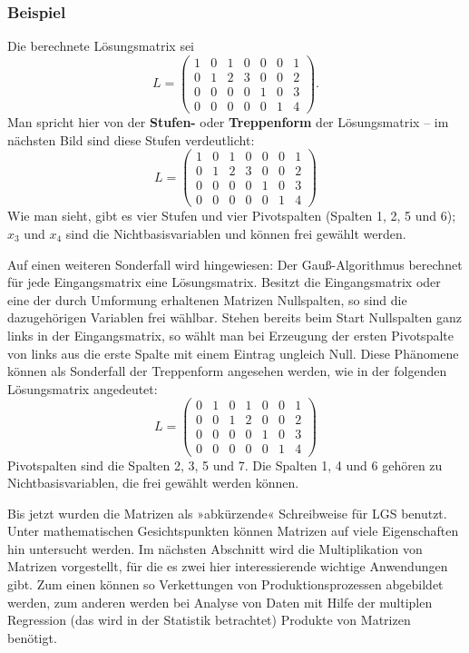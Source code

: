 \subsubsection{Beispiel}

Die berechnete Lösungsmatrix sei
\[ L = \left(\begin{array}{cccccc|c} 1 & 0 & 1 & 0 & 0 & 0 & 1\\ 0 & 1 & 2 & 3 & 0 & 0 & 2\\ 0 & 0 & 0 & 0 & 1 & 0 & 3\\ 0 & 0 & 0 & 0 & 0 & 1 & 4 \end{array}\right) . \]
Man spricht hier von der \textbf{Stufen-} oder \textbf{Treppenform} der Lösungsmatrix -- im nächsten Bild sind diese Stufen verdeutlicht:
\[ L = \left(\begin{array}{cccccc|c} \boxed{1} & 0 & 1 & 0 & 0 & 0 & 1\\ 0 & \boxed{1} & 2 & 3 & 0 & 0 & 2\\ 0 & 0 & 0 & 0 & \boxed{1} & 0 & 3\\ 0 & 0 & 0 & 0 & 0 & \boxed{1} & 4 \end{array}\right) \]
Wie man sieht, gibt es vier Stufen und vier Pivotspalten (Spalten 1, 2, 5 und 6); $x_3$ und $x_4$ sind die Nichtbasisvariablen und können frei gewählt werden.

Auf einen weiteren Sonderfall wird hingewiesen: Der Gauß-Algorithmus berechnet für jede Eingangsmatrix eine Lösungsmatrix. Besitzt die Eingangsmatrix oder eine der durch Umformung erhaltenen Matrizen Nullspalten, so sind die dazugehörigen Variablen frei wählbar. Stehen bereits beim Start Nullspalten ganz links in der Eingangsmatrix, so wählt man bei Erzeugung der ersten Pivotspalte von links aus die erste Spalte mit einem Eintrag ungleich Null. Diese Phänomene können als Sonderfall der Treppenform angesehen werden, wie in der folgenden Lösungsmatrix angedeutet:
\[ L = \left(\begin{array}{cccccc|c} 0 & 1 & 0 & 1 & 0 & 0 & 1\\ 0 & 0 & 1 & 2 & 0 & 0 & 2\\ 0 & 0 & 0 & 0 & 1 & 0 & 3\\ 0 & 0 & 0 & 0 & 0 & 1 & 4 \end{array}\right) \]
Pivotspalten sind die Spalten 2, 3, 5 und 7. Die Spalten 1, 4 und 6 gehören zu Nichtbasisvariablen, die frei gewählt werden können.

Bis jetzt wurden die Matrizen als »abkürzende« Schreibweise für LGS benutzt. Unter mathematischen Gesichtspunkten können Matrizen auf viele Eigenschaften hin untersucht werden.
Im nächsten Abschnitt wird die Multiplikation von Matrizen vorgestellt, für die es zwei hier interessierende wichtige Anwendungen gibt. Zum einen können so Verkettungen von Produktionsprozessen abgebildet werden, zum anderen werden bei Analyse von Daten mit Hilfe der multiplen Regression (das wird in der Statistik betrachtet) Produkte von Matrizen benötigt.

